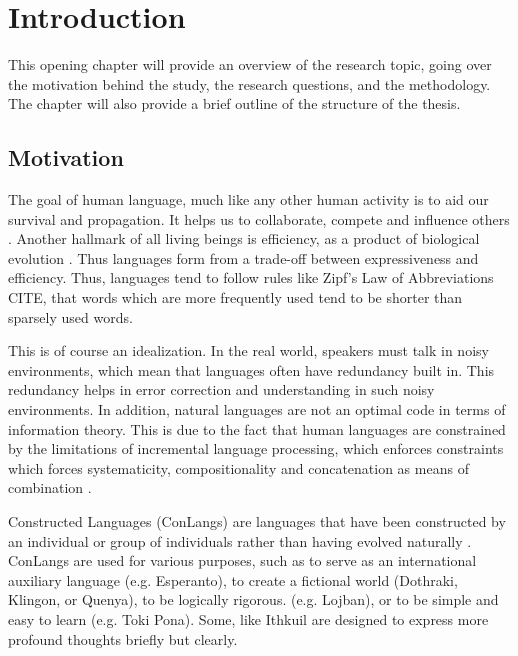 
\chapter{Introduction}\label{chapter:introduction}

This opening chapter will provide an overview of the research topic, going over the motivation behind the study, the research questions, and the 
methodology. The chapter will also provide a brief outline of the structure of the thesis.

\section{Motivation}

The goal of human language, much like any other human activity is to aid our survival and propagation. It helps us to collaborate, compete and 
influence others \cite{Levshina_2022}. Another hallmark of all living beings is efficiency, as a product of biological evolution \cite{haCostBenefit2010}. 
Thus languages form from a trade-off between expressiveness and efficiency. Thus, languages tend to follow rules like Zipf's Law of Abbreviations CITE, 
that words which are more frequently used tend to be shorter than sparsely used words. 

This is of course an idealization. In the real world, speakers must talk in noisy environments, which mean that languages often have redundancy
built in. This redundancy helps in error correction and understanding in such noisy environments. In addition, natural languages are not an
optimal code in terms of information theory. This is due to the fact that human languages are constrained by the limitations of incremental
language processing, which enforces constraints which forces systematicity, compositionality and concatenation as means of 
combination \cite{futrellInformationTheoryBridge2022}.

Constructed Languages (ConLangs) are languages that have been constructed by an individual or group of individuals rather than having evolved 
naturally \cite{schreyerConstructedLanguages2021}. ConLangs are used for various purposes, such as to serve as an international auxiliary 
language (e.g. Esperanto), to create a fictional world (Dothraki, Klingon, or Quenya), to be logically rigorous. (e.g. Lojban), or to be simple 
and easy to learn (e.g. Toki Pona). Some, like Ithkuil \cite{Ithkuil2024} are designed to express more profound thoughts briefly but clearly. 



